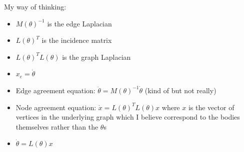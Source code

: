 \documentclass[conference]{IEEEtran}
\begin{document}

My way of thinking:
\begin{itemize}
    \item $M(\theta)^{-1}$ is the edge Laplacian
    \item $L(\theta)^T$ is the incidence matrix
    \item $L(\theta)^TL(\theta)$ is the graph Laplacian
    \item $x_e = \dot{\theta}$
    \item Edge agreement equation: $\ddot{\theta} = M(\theta)^{-1}\dot{\theta}$ (kind of but not really)
    \item Node agreement equation: $\dot{x} = L(\theta)^TL(\theta)x$ where $x$ is the vector of vertices in the underlying graph which I believe correspond to the bodies themselves rather than the $\theta$s
    \item $\dot{\theta} = L(\theta)x$
\end{itemize}
\end{document}
